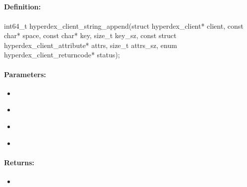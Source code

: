 \pagebreak
\subsection{}
\label{api:c:string_append}


\paragraph{Definition:}
\begin{ccode}
int64_t hyperdex_client_string_append(struct hyperdex_client* client,
        const char* space,
        const char* key, size_t key_sz,
        const struct hyperdex_client_attribute* attrs, size_t attrs_sz,
        enum hyperdex_client_returncode* status);
\end{ccode}

\paragraph{Parameters:}
\begin{itemize}[noitemsep]
\item {}\\

\item {}\\

\item {}\\

\item {}\\

\end{itemize}

\paragraph{Returns:}
\begin{itemize}[noitemsep]
\item {}\\

\end{itemize}


